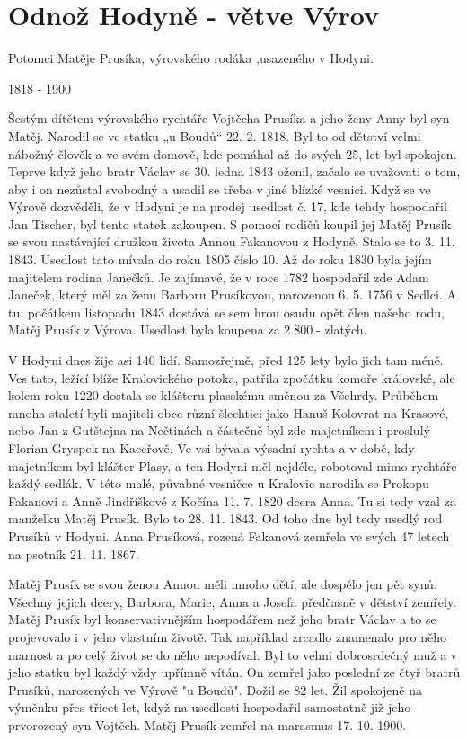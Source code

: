 \documentclass[../dejiny-rodu-prusiku.tex]{subfiles}
\begin{document}
\section{Odnož Hodyně - větve Výrov}

Potomci Matěje Prusíka, výrovského rodáka ,usazeného v Hodyni.

1818 - 1900

Šestým dítětem výrovského rychtáře Vojtěcha Prusíka a jeho ženy Anny byl syn Matěj. Narodil se ve statku „u Boudů“ 22. 2. 1818. Byl to od dětství velmi nábožný člověk a ve svém domově, kde pomáhal až do svých 25, let byl spokojen. Teprve když jeho bratr Václav se 30. led­na 1843 oženil, začalo se uvažovati o tom, aby i on nezůstal svobodný a usadil se třeba v jiné blízké vesnici. Když se ve Výrově dozvěděli, že v Hodyni je na prodej usedlost č. 17, kde tehdy hospodařil Jan Tischer, byl tento statek zakoupen. S pomocí rodičů koupil jej Ma­těj Prusík se svou nastávající družkou života Annou Fakanovou z Hodyně. Stalo se to 3. 11. 1843. Usedlost tato mívala do roku 1805 číslo 10. Až do roku 1830 byla jejím majitelem rodina Janečků. Je zajímavé, že v roce 1782 hospodařil zde Adam Janeček, který měl za ženu Barboru Prusíkovou, narozenou 6. 5. 1756 v Sedlci. A tu, počátkem listopadu 1843 dostává se sem hrou osudu opět člen našeho rodu, Matěj Prusík z Výrova. Usedlost byla koupena za 2.800.- zlatých.

V Hodyni dnes žije asi 140 lidí. Samozřejmě, před 125 lety bylo jich tam méně. Ves tato, ležící blíže Kralovického potoka, patřila zpočátku komoře královské, ale kolem roku 1220 dostala se klášteru plasskému směnou za Všehrdy. Průběhem mnoha staletí byli majiteli obce různí šlechtici jako Hanuš Kolovrat na Krasové, nebo Jan z Gutštejna na Nečtinách a částečně byl zde majetníkem i proslulý Florian Gryspek na Kaceřově. Ve vsi bývala výsadní rychta a v do­bě, kdy majetníkem byl klášter Plasy, a ten Hodyni měl nej­déle, robotoval mimo rychtáře každý sedlák. V této malé, půvabné vesničce u Kralovic narodila se Prokopu Fakanovi a Anně Jindříškové z Kočína 11. 7. 1820 dcera Anna. Tu si tedy vzal za manželku Matěj Prusík. Bylo to 28. 11. 1843. Od toho dne byl tedy usedlý rod Prusíků v Hodyni. Anna Pru­síková, rozená Fakanová zemřela ve svých 47 letech na psotník 21. 11. 1867.

Matěj Prusík se svou ženou Annou měli mnoho dětí, ale dospělo jen pět synů. Všechny jejich dcery, Barbora, Marie, Anna a Josefa předčasně v dětství zemřely. Matěj Prusík byl konservativnějším hospodářem než jeho bratr Václav a to se projevovalo i v jeho vlastním životě. Tak například zrcadlo znamenalo pro něho marnost a po celý život se do něho nepodíval. Byl to velmi dobrosrdečný muž a v jeho statku byl každý vždy upřímně vítán. On zemřel jako poslední ze čtyř bratrů Prusíků, narozených ve Výrově "u Boudů". Dožil se 82 let. Žil spokoje­ně na výměnku přes třicet let, když na usedlosti hospo­dařil samostatně již jeho prvorozený syn Vojtěch. Matěj Prusík zemřel na marasmus 17. 10. 1900.
\end{document}
